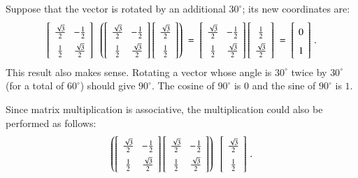Suppose that the vector is rotated by an additional $30^{\circ}$; its new coordinates are:
\begin{equation}\label{eq.rotate1}
\spacearray
\left[\begin{array}{cc}\frac{\sqrt{3}}{2}&-\frac{1}{2}\\\frac{1}{2}&\frac{\sqrt{3}}{2}\end{array}\right]\;\;
\left(\left[\begin{array}{cc}\frac{\sqrt{3}}{2}&-\frac{1}{2}\\\frac{1}{2}&\frac{\sqrt{3}}{2}\end{array}\right]
\left[\begin{array}{c}\frac{\sqrt{3}}{2}\\\frac{1}{2}\end{array}\right]\right)\;=\;
\left[\begin{array}{cc}\frac{\sqrt{3}}{2}&-\frac{1}{2}\\\frac{1}{2}&\frac{\sqrt{3}}{2}\end{array}\right]
\left[\begin{array}{c}\frac{1}{2}\\\frac{\sqrt{3}}{2}\end{array}\right]\;=\;
\left[\begin{array}{c}0\\1\end{array}\right]\,.
\end{equation}
This result also makes sense. Rotating a vector whose angle is $30^{\circ}$ twice by $30^{\circ}$ (for a total of $60^\circ$) should give $90^{\circ}$. The cosine of $90^{\circ}$ is $0$ and the sine of $90^{\circ}$ is $1$.

Since matrix multiplication is associative, the multiplication could also be performed as follows:
\begin{equation}\label{eq.rotate2}
\spacearray
\left(\left[\begin{array}{cc}\frac{\sqrt{3}}{2}&-\frac{1}{2}\\\frac{1}{2}&\frac{\sqrt{3}}{2}\end{array}\right]
\left[\begin{array}{cc}\frac{\sqrt{3}}{2}&-\frac{1}{2}\\\frac{1}{2}&\frac{\sqrt{3}}{2}\end{array}\right]\right)\;\;
\left[\begin{array}{c}\frac{\sqrt{3}}{2}\\\frac{1}{2}\end{array}\right]\,.
\end{equation}


